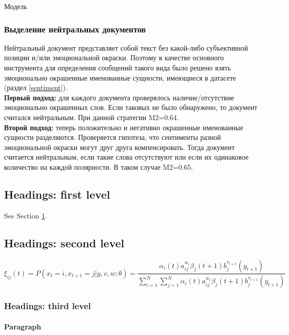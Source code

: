 \documentclass{article}
\begin{document}
\begin{section}{Модель}
\subsubsection{Выделение нейтральных документов}
Нейтральный документ представляет собой текст без какой-либо субъективной позиции и/или эмоциональной окраски. Поэтому в качестве основного инструмента для определения сообщений такого вида было решено взять эмоционально окрашенные именованные сущности, имеющиеся в датасете (раздел \textcolor{cyan}{\ref{sentiment}}).\\

\textbf{Первый подход:} для каждого документа проверялось наличие/отсутствие эмоционально окрашенных слов. Если таковых не было обнаружено, то документ считался нейтральным. При данной стратегии M2=0.64.\\

\textbf{Второй подход:} теперь положительно и негативно окрашенные именованные сущности разделяются. Проверяется гипотеза, что сентименты разной эмоциональной окраски могут друг друга компенсировать. Тогда документ считается нейтральным, если такие слова отсутствуют или если их одинаковое количество на каждой полярности. В таком случае M2=0.65.
\section{Headings: first level}
\label{sec:headings}

\lipsum[4] See Section \ref{sec:headings}.

\subsection{Headings: second level}
\lipsum[5]
\begin{equation}
	\xi _{ij}(t)=P(x_{t}=i,x_{t+1}=j|y,v,w;\theta)= {\frac {\alpha _{i}(t)a^{w_t}_{ij}\beta _{j}(t+1)b^{v_{t+1}}_{j}(y_{t+1})}{\sum _{i=1}^{N} \sum _{j=1}^{N} \alpha _{i}(t)a^{w_t}_{ij}\beta _{j}(t+1)b^{v_{t+1}}_{j}(y_{t+1})}}
\end{equation}

\subsubsection{Headings: third level}
\lipsum[6]

\paragraph{Paragraph}
\lipsum[7]




\end{section}
\end{document}
